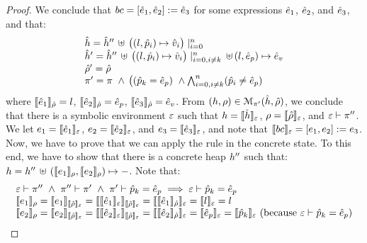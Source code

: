 \begin{proof}
\noindent{}
We conclude that  $\bcmd = [\sexpr_1, \sexpr_2] := \sexpr_3$ for some expressions $\sexpr_1$, $\sexpr_2$, 
and $\sexpr_3$, and that: 
$$
\begin{array}{l}
  \sheap =  \sheap'' \, \uplus \, \big((l, \sexprp_i) \mapsto \sexprv_i\big)\mid_{i = 0}^n    \\
  \sheap' = \sheap'' \, \uplus \,  \big((l, \sexprp_i) \mapsto \sexprv_i\big)\mid_{i = 0, i \neq k}^n \, \uplus \,  (l, \sexpr_p) \mapsto \sexpr_v  \\
  \sstore' = \sstore \\ 
  \pc' = \pc \ \wedge \, \big( (\sexprp_k = \sexpr_p) \ \wedge \bigwedge_{i = 0, i \neq k}^n (\sexprp_i \neq \sexpr_p)
\end{array}
$$ 
where $\symbeval{\sexpr_1}{\sstore} =  \loc$, $\symbeval{\sexpr_2}{\sstore} =  \sexpr_p$, 
$\symbeval{\sexpr_3}{\sstore} =  \sexpr_v$.
From $(\heap, \store) \in \smodels{\sheap, \sstore}{\pc'}$, we conclude that there is a symbolic environment
$\senv$ such that $\heap = \semexpr{\sheap}{\senv}$, $\store = \semexpr{\sstore}{\senv}$, and 
$\senv \vdash \pc''$. 
We let $\jsilexpr_1 = \symbeval{\sexpr_1}{\senv}$, 
$\jsilexpr_2 = \symbeval{\sexpr_2}{\senv}$, and $\jsilexpr_3 = \symbeval{\sexpr_3}{\senv}$, and note that $\symbeval{\bcmd}{\senv} = [\jsilexpr_1, \jsilexpr_2] := \jsilexpr_3$.
Now, we have to prove that we can apply the  rule in the concrete state.
To this end, we have to show that there is a concrete heap $\heap''$ such that:
$\heap = \heap'' \dunion \hcell{\symbeval{\jsilexpr_1}{\store}}{\symbeval{\jsilexpr_2}{\store}}{-}$. 
Note that: 
$$
\begin{array}{l}
%
\senv \vdash \pc'' \ \wedge \ \pc'' \vdash \pc' \ \wedge \ \pc' \vdash \sexprp_k = \sexpr_p \implies \senv \vdash \sexprp_k = \sexpr_p \\
%
 \symbeval{\jsilexpr_1}{\store} = \symbeval{\jsilexpr_1}{\symbeval{\sstore}{\senv}} = \symbeval{\symbeval{\sexpr_1}{\senv}}{\symbeval{\sstore}{\senv}} = \symbeval{\symbeval{\sexpr_1}{\sstore}}{\senv} 
    = \symbeval{\loc}{\senv} = \loc \\ 
  \symbeval{\jsilexpr_2}{\store}  = \symbeval{\jsilexpr_2}{\semexpr{\sstore}{\senv}} =  \symbeval{\symbeval{\sexpr_2}{\senv}}{\symbeval{\sstore}{\senv}} = \symbeval{\symbeval{\sexpr_2}{\sstore}}{\senv}
   =  \symbeval{\sexpr_p}{\senv} = \symbeval{\sexprp_k}{\senv}  \text{ (because $\senv \vdash \sexprp_k = \sexpr_p$)} \\

\end{array}$$
\end{proof}
